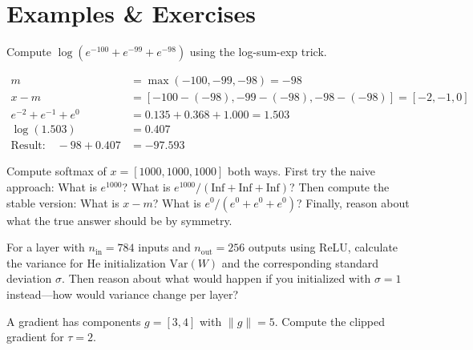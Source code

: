 \newpage
\section{Examples \& Exercises}


 Compute $\log(e^{-100} + e^{-99} + e^{-98})$ using the log-sum-exp trick.

\begin{align*}
    m &= \max(-100, -99, -98) = -98 \\
    x - m &= [-100-(-98), -99-(-98), -98-(-98)] = [-2, -1, 0] \\
    e^{-2} + e^{-1} + e^{0} &= 0.135 + 0.368 + 1.000 = 1.503 \\
    \log(1.503) &= 0.407 \\
    \text{Result:} \quad -98 + 0.407 &= -97.593
\end{align*}



\vspace{2em}
 Compute softmax of $x = [1000, 1000, 1000]$ both ways.
First try the naive approach: What is $e^{1000}$? What is $e^{1000}/(\text{Inf}+\text{Inf}+\text{Inf})$?
Then compute the stable version: What is $x - m$? What is $e^0 / (e^0 + e^0 + e^0)$?
Finally, reason about what the true answer should be by symmetry.


\vspace{2em}
 For a layer with $n_{\text{in}} = 784$ inputs and $n_{\text{out}} = 256$ outputs using ReLU,
calculate the variance for He initialization $\text{Var}(W)$ and the corresponding standard deviation $\sigma$.
Then reason about what would happen if you initialized with $\sigma = 1$ instead---how would variance change per layer?



\vspace{2em}
 A gradient has components $g = [3, 4]$ with $\|g\| = 5$. Compute the clipped gradient for $\tau = 2$.

